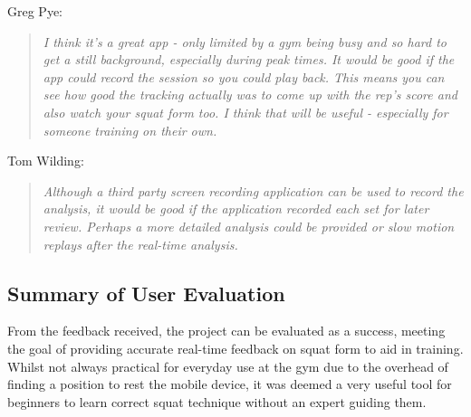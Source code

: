 Greg Pye:
\begin{quote}
\emph{I think it's a great app - only limited by a gym being busy and so hard to get a still background, especially during peak times. It would be good if the app could record the session so you could play back. This means you can see how good the tracking actually was to come up with the rep's score and also watch your squat form too. I think that will be useful - especially for someone training on their own.}
\end{quote}

Tom Wilding:
\begin{quote}
\emph{Although a third party screen recording application can be used to record the analysis, it would be good if the application recorded each set for later review. Perhaps a more detailed analysis could be provided or slow motion replays after the real-time analysis.}
\end{quote}

\subsection{Summary of User Evaluation}

From the feedback received, the project can be evaluated as a success, meeting the goal of providing accurate real-time feedback on squat form to aid in training. Whilst not always practical for everyday use at the gym due to the overhead of finding a position to rest the mobile device, it was deemed a very useful tool for beginners to learn correct squat technique without an expert guiding them.